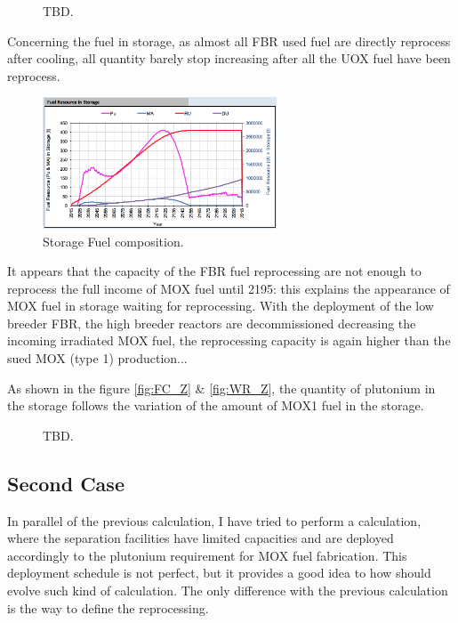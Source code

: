 \documentclass[12pt]{article}
\begin{document}
\begin{figure}[h!]
\centering
{}
\caption{TBD.\label{fig:cool_reprocc} }
\end{figure}


Concerning the fuel in storage, as almost all FBR
used fuel are directly reprocess after cooling,
all quantity barely stop increasing after all the
UOX fuel have been reprocess.

\begin{figure}[h!]
\centering
\includegraphics[width=0.62\textwidth]{img/FuelInStorage_1}
\caption{Storage Fuel composition.}
\label{fig:storagecompo_1}
\end{figure}

It appears that the capacity of the FBR fuel
reprocessing are not enough to reprocess the full
income of MOX fuel until 2195: this explains the
appearance of MOX fuel in storage waiting for
reprocessing. With the deployment of the low
breeder FBR, the high breeder reactors are
decommissioned decreasing the incoming irradiated
MOX fuel,  the reprocessing capacity is again
higher than the sued MOX (type 1) production...


As shown in the figure \ref{fig:FC_Z} \&
\ref{fig:WR_Z}, the quantity of plutonium in the
storage follows the variation of the amount of MOX1
fuel in the storage.

\begin{figure}[h!]
\centering
{}
\caption{TBD.\label{fig:FC_WR_zoom} }
\end{figure}

\subsection{Second Case}
In parallel of the previous calculation, I have
tried to perform a calculation, where the
separation facilities have limited capacities and
are deployed accordingly to the plutonium
requirement for MOX fuel fabrication. This
deployment schedule is not perfect, but it
provides a good idea to how should evolve such
kind of calculation.
The only difference with the previous calculation
is the way to define the reprocessing.
\end{document}
